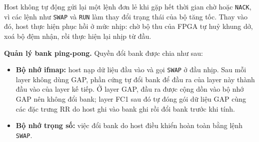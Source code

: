 Host không tự động gửi lại một lệnh đơn lẻ khi gặp hết thời gian chờ hoặc \texttt{NACK}, vì các lệnh như \texttt{SWAP} và \texttt{RUN} làm thay đổi trạng thái của bộ tăng tốc.
Thay vào đó, host thực hiện phục hồi ở mức nhịp: chờ bộ thu của FPGA tự huỷ khung dở, xoá bộ đệm nhận, rồi thực hiện lại nhịp từ đầu.

\textbf{Quản lý bank ping-pong.}
Quyền đổi bank được chia như sau:
\begin{itemize}
  \item \textbf{Bộ nhớ ifmap:} host nạp dữ liệu đầu vào và gọi \texttt{SWAP} ở đầu nhịp. Sau mỗi layer không dùng GAP, phần cứng tự đổi bank để đầu ra của layer này thành đầu vào của layer kế tiếp. Ở layer GAP, đầu ra được cộng dồn vào bộ nhớ GAP nên không đổi bank; layer FC1 sau đó tự đóng gói dữ liệu GAP cùng các đặc trưng RR do host ghi vào bank ghi rồi đổi bank trước khi tính.
  \item \textbf{Bộ nhớ trọng số:} việc đổi bank do host điều khiển hoàn toàn bằng lệnh \texttt{SWAP}.
\end{itemize}
